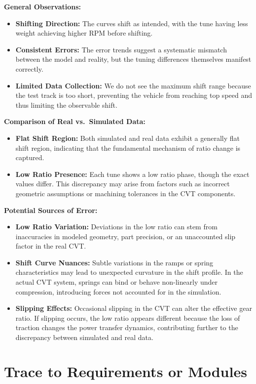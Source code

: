 \documentclass[12pt, titlepage]{article}
\begin{document}
\textbf{General Observations:}
\begin{itemize}
    \item \textbf{Shifting Direction:} The curves shift as intended, with the tune having less weight achieving higher RPM before shifting.
    \item \textbf{Consistent Errors:} The error trends suggest a systematic mismatch between the model and reality, but the tuning differences themselves manifest correctly.
    \item \textbf{Limited Data Collection:} We do not see the maximum shift range because the test track is too short, preventing the vehicle from reaching top speed and thus limiting the observable shift.
\end{itemize}

\textbf{Comparison of Real vs.\ Simulated Data:}
\begin{itemize}
    \item \textbf{Flat Shift Region:} Both simulated and real data exhibit a generally flat shift region, indicating that the fundamental mechanism of ratio change is captured.
    \item \textbf{Low Ratio Presence:} Each tune shows a low ratio phase, though the exact values differ. This discrepancy may arise from factors such as incorrect geometric assumptions or machining tolerances in the CVT components.
\end{itemize}

\textbf{Potential Sources of Error:}
\begin{itemize}
    \item \textbf{Low Ratio Variation:} Deviations in the low ratio can stem from inaccuracies in modeled geometry, part precision, or an unaccounted slip factor in the real CVT.
    \item \textbf{Shift Curve Nuances:} Subtle variations in the ramps or spring characteristics may lead to unexpected curvature in the shift profile. In the actual CVT system, springs can bind or behave non-linearly under compression, introducing forces not accounted for in the simulation.
    \item \textbf{Slipping Effects:} Occasional slipping in the CVT can alter the effective gear ratio. If slipping occurs, the low ratio appears different because the loss of traction changes the power transfer dynamics, contributing further to the discrepancy between simulated and real data.
\end{itemize}

\section{Trace to Requirements or Modules}
\end{document}
